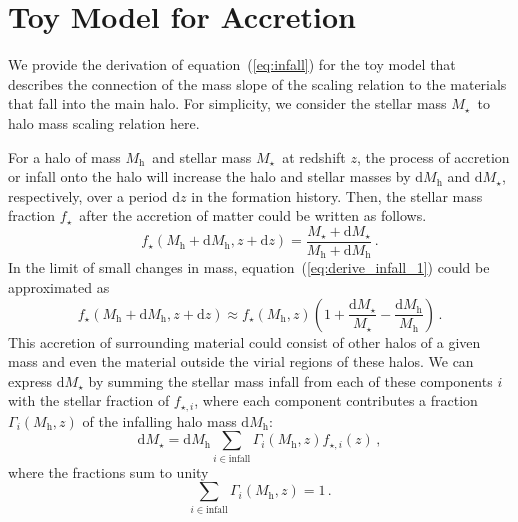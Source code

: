 \documentclass[useAMS,usenatbib,iop,numberedappendix]{mn2e}
\newcommand{\redshift}{\ensuremath{z}}
\newcommand{\dif}{\ensuremath{\mathrm{d}}}
\newcommand{\Mstar}{\ensuremath{M_{\star}}}
\newcommand{\Mhalo}{\ensuremath{M_{\mathrm{h}}}}
\newcommand{\fstar}{\ensuremath{f_{\star}}}
\begin{document}
%
%

\appendix

\section{Toy Model for Accretion}
\label{sec:infall_equation}

We provide the derivation of equation~(\ref{eq:infall}) for the toy model that describes the connection of the mass slope of the scaling relation to the materials that fall into the main halo.  For simplicity, we consider the stellar mass \Mstar\ to halo mass scaling relation here.

For a halo of mass \Mhalo\ and stellar mass \Mstar\ at redshift \redshift, the process of accretion or infall onto the halo will increase the halo and stellar masses by $\dif\Mhalo$ and $\dif\Mstar$, respectively, over a period $\dif\redshift$ in the formation history.
Then, the stellar mass fraction \fstar\ after the accretion of matter could be written as follows.
%
\begin{equation}
\label{eq:derive_infall_1}
\fstar(\Mhalo + \dif\Mhalo, \redshift + \dif\redshift) = 
\frac{\Mstar+ \dif\Mstar}{\Mhalo + \dif\Mhalo } \, .
\end{equation}
%
In the limit of small changes in mass, equation~(\ref{eq:derive_infall_1}) could be approximated as
%
\begin{equation}
\label{eq:derive_infall_2}
\fstar(\Mhalo + \dif\Mhalo, \redshift + \dif\redshift) \approx 
\fstar(\Mhalo, \redshift) \left(
1 + 
\frac{\dif\Mstar}{\Mstar} - 
\frac{\dif\Mhalo}{\Mhalo}
\right)
\, .
\end{equation}
%
This accretion of surrounding material could consist of other halos of a given mass and even the material outside the virial regions of these halos.  We can express $\dif\Mstar$ by summing the stellar mass infall from each of these components $i$ with the stellar fraction of $f_{\mathrm{\star},i}$, where each component contributes a fraction $\Gamma_{i}(\Mhalo, \redshift)$ of the infalling halo mass $\dif\Mhalo$:
%
\begin{equation}
\label{eq:derive_infall_3}
\dif\Mstar = \dif\Mhalo
\sum_{i \in \mathrm{infall}} 
\Gamma_{i}(\Mhalo, \redshift)  f_{\mathrm{\star},i}(\redshift)
\, ,
\end{equation}
%
where the fractions sum to unity
%
\begin{equation}
\label{eq:derive_infall_35}
\sum_{i \in \mathrm{infall}} 
\Gamma_{i}(\Mhalo, \redshift)  = 1
\, .
\end{equation}
\end{document}
